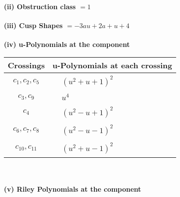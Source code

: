 \documentclass[1p]{elsarticle_modified}
\theoremstyle{definition}
\begin{document}
\flushleft \textbf{(ii) Obstruction class $= 1$}\\~\\
\flushleft \textbf{(iii) Cusp Shapes $= -3 a u+2 a+u+4$}\\~\\
\newpage\renewcommand{\arraystretch}{1}
\flushleft \textbf{(iv) u-Polynomials at the component}\newline \\
\begin{tabular}{m{50pt}|m{274pt}}
Crossings & \hspace{64pt}u-Polynomials at each crossing \\
\hline $$\begin{aligned}c_{1},c_{2},c_{5}\end{aligned}$$&$\begin{aligned}
&(u^2+u+1)^2
\end{aligned}$\\
\hline $$\begin{aligned}c_{3},c_{9}\end{aligned}$$&$\begin{aligned}
&u^4
\end{aligned}$\\
\hline $$\begin{aligned}c_{4}\end{aligned}$$&$\begin{aligned}
&(u^2- u+1)^2
\end{aligned}$\\
\hline $$\begin{aligned}c_{6},c_{7},c_{8}\end{aligned}$$&$\begin{aligned}
&(u^2- u-1)^2
\end{aligned}$\\
\hline $$\begin{aligned}c_{10},c_{11}\end{aligned}$$&$\begin{aligned}
&(u^2+u-1)^2
\end{aligned}$\\
\hline
\end{tabular}\\~\\
\newpage\renewcommand{\arraystretch}{1}
\flushleft \textbf{(v) Riley Polynomials at the component}\newline \\
\end{document}
